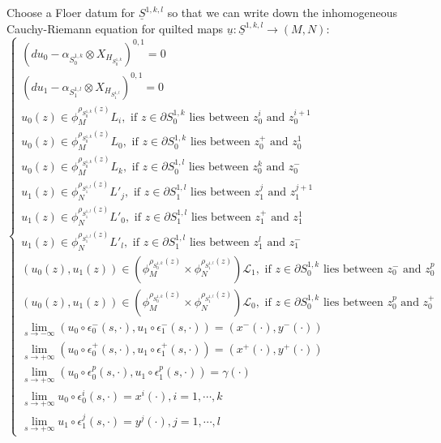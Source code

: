 \documentclass{amsart}
\numberwithin{equation}{section}
\numberwithin{figure}{section}
\begin{document}
	Choose a Floer datum for $\underline{S}^{1, k, l}$ so that we can write down the inhomogeneous Cauchy-Riemann equation for quilted maps $\underline{u}: \underline{S}^{1, k, l} \to (M, N)$:
\begin{equation}
\begin{cases}
(du_{0} - \alpha_{S^{1,k}_{0}} \otimes X_{H_{S^{1,k}_{0}}})^{0, 1} = 0\\
(du_{1} - \alpha_{S^{1,l}_{1}} \otimes X_{H_{S^{1,l}_{1}}})^{0, 1} = 0\\
u_{0}(z) \in \phi_{M}^{\rho_{S^{1, k}_{0}}(z)}L_{i}, \text{ if $z \in \partial S^{1, k}_{0}$ lies between $z_{0}^{i}$ and $z_{0}^{i+1}$}\\
u_{0}(z) \in \phi_{M}^{\rho_{S^{1, k}_{0}}(z)}L_{0}, \text{ if $z \in \partial S^{1, k}_{0}$ lies between $z_{0}^{+}$ and $z_{0}^{1}$ }\\
u_{0}(z) \in \phi_{M}^{\rho_{S^{1, k}_{0}}(z)}L_{k}, \text{ if $z \in \partial S^{1, l}_{0}$ lies between $z_{0}^{k}$ and $z_{0}^{-}$ }\\
u_{1}(z) \in \phi_{N}^{\rho_{S^{1, l}_{1}}(z)}L'_{j}, \text{ if $z \in  \partial S^{1, l}_{1}$ lies between $z_{1}^{j}$ and $z_{1}^{j+1}$}\\
u_{1}(z) \in \phi_{N}^{\rho_{S^{1, l}_{1}}(z)}L'_{0}, \text{ if $z \in \partial S^{1, l}_{1}$ lies between $z_{1}^{+}$ and $z_{1}^{1}$ }\\
u_{1}(z) \in \phi_{N}^{\rho_{S^{1, l}_{1}}(z)}L'_{l}, \text{ if $z \in \partial S^{1, l}_{1}$ lies between $z_{1}^{l}$ and $z_{1}^{-}$ }\\
(u_{0}(z), u_{1}(z)) \in (\phi_{M}^{\rho_{S^{1, k}_{0}}(z)} \times \phi_{N}^{\rho_{S^{1, l}_{1}}(z)})\mathcal{L}_{1}, \text{ if $z \in \partial S^{1, k}_{0}$ lies between $z_{0}^{-}$ and $z_{0}^{p}$}\\
(u_{0}(z), u_{1}(z)) \in (\phi_{M}^{\rho_{S^{1, k}_{0}}(z)} \times \phi_{N}^{\rho_{S^{1, l}_{1}}(z)})\mathcal{L}_{0}, \text{ if $z \in \partial S^{1, k}_{0}$ lies between $z_{0}^{p}$ and $z_{0}^{+}$}\\
\lim\limits_{s \to -\infty} (u_{0} \circ \epsilon_{0}^{-}(s, \cdot), u_{1} \circ \epsilon_{1}^{-}(s, \cdot)) = (x^{-}(\cdot), y^{-}(\cdot))\\
\lim\limits_{s \to +\infty} (u_{0} \circ \epsilon_{0}^{+}(s, \cdot), u_{1} \circ \epsilon_{1}^{+}(s, \cdot)) = (x^{+}(\cdot), y^{+}(\cdot))\\
\lim\limits_{s \to +\infty} (u_{0} \circ \epsilon_{0}^{p}(s, \cdot), u_{1} \circ \epsilon_{1}^{p}(s, \cdot)) = \gamma(\cdot)\\
\lim\limits_{s \to +\infty} u_{0} \circ \epsilon_{0}^{i}(s, \cdot) = x^{i}(\cdot), i = 1, \cdots, k\\
\lim\limits_{s \to +\infty} u_{1} \circ \epsilon_{1}^{j}(s, \cdot) = y^{j}(\cdot), j = 1, \cdots, l
\end{cases}
\end{equation} 
\end{document}
